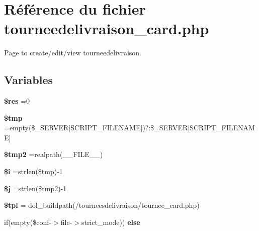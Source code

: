 \hypertarget{tourneedelivraison__card_8php}{}\section{Référence du fichier tourneedelivraison\+\_\+card.\+php}
\label{tourneedelivraison__card_8php}


Page to create/edit/view tourneedelivraison.  


\subsection*{Variables}
\begin{DoxyCompactItemize}
\item 
\mbox{\label{tourneedelivraison__card_8php_a49a8a4009b02e49717caa88b128affc5}} 
{\bfseries \$res} =0
\item 
\mbox{\label{tourneedelivraison__card_8php_a57024d47cf8348153f5fdda16f8fefa9}} 
{\bfseries \$tmp} =empty(\$\+\_\+\+S\+E\+R\+V\+ER\mbox{[}\textquotesingle{}S\+C\+R\+I\+P\+T\+\_\+\+F\+I\+L\+E\+N\+A\+ME\textquotesingle{}\mbox{]})?\textquotesingle{}\textquotesingle{}\+:\$\+\_\+\+S\+E\+R\+V\+ER\mbox{[}\textquotesingle{}S\+C\+R\+I\+P\+T\+\_\+\+F\+I\+L\+E\+N\+A\+ME\textquotesingle{}\mbox{]}
\item 
\mbox{\label{tourneedelivraison__card_8php_aed9bcb6730d1510376ce80e32bd9504d}} 
{\bfseries \$tmp2} =realpath(\+\_\+\+\_\+\+F\+I\+L\+E\+\_\+\+\_\+)
\item 
\mbox{\label{tourneedelivraison__card_8php_a83018d9153d17d91fbcf3bc10158d34f}} 
{\bfseries \$i} =strlen(\$tmp)-\/1
\item 
\mbox{\label{tourneedelivraison__card_8php_a6f16db779ef3ccea921b277b5dc245d1}} 
{\bfseries \$j} =strlen(\$tmp2)-\/1
\item 
\mbox{\label{tourneedelivraison__card_8php_a04b1944cdb09f9a4e290cde7a12499e6}} 
{\bfseries \$tpl} = dol\+\_\+buildpath(\textquotesingle{}/tourneesdelivraison/tournee\+\_\+card.\+php\textquotesingle{})
\item 
if(empty(\$conf-\/$>$file-\/$>$strict\+\_\+mode)) {\bfseries else}
\end{DoxyCompactItemize}



